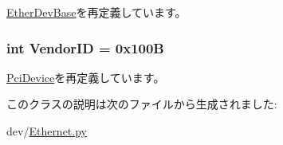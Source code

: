\hyperlink{classEthernet_1_1EtherDevBase_acce15679d830831b0bbe8ebc2a60b2ca}{EtherDevBase}を再定義しています。\hypertarget{classEthernet_1_1NSGigE_a96ec1b4422f12f72160a0633ada47217}{
\subsubsection[{VendorID}]{\setlength{\rightskip}{0pt plus 5cm}int {\bf VendorID} = 0x100B}}
\label{classEthernet_1_1NSGigE_a96ec1b4422f12f72160a0633ada47217}


\hyperlink{classPci_1_1PciDevice_a48f611c5f9d4755971b7c867e4529cc6}{PciDevice}を再定義しています。

このクラスの説明は次のファイルから生成されました:\begin{DoxyCompactItemize}
\item 
dev/\hyperlink{Ethernet_8py}{Ethernet.py}\end{DoxyCompactItemize}
